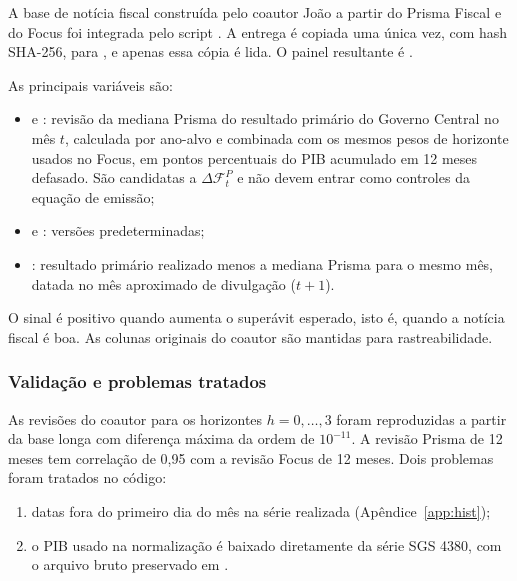 \documentclass[12pt,a4paper]{article}
\begin{document}
A base de notícia fiscal construída pelo coautor João a partir do Prisma Fiscal e do
Focus foi integrada pelo script . A entrega é
copiada uma única vez, com hash SHA-256, para
, e apenas essa cópia é lida. O painel
resultante é .

As principais variáveis são:

\begin{itemize}[leftmargin=1.2cm]
    \item {} e
    : revisão da mediana Prisma do resultado
    primário do Governo Central no mês \(t\), calculada por ano-alvo e combinada com
    os mesmos pesos de horizonte usados no Focus, em pontos percentuais do PIB
    acumulado em 12 meses defasado. São candidatas a \(\Delta\mathcal{F}_t^P\) e não
    devem entrar como controles da equação de emissão;
    \item {} e
    : versões predeterminadas;
    \item {}: resultado primário realizado menos
    a mediana Prisma para o mesmo mês, datada no mês aproximado de divulgação
    (\(t+1\)).
\end{itemize}

O sinal é positivo quando aumenta o superávit esperado, isto é, quando a notícia
fiscal é boa. As colunas originais do coautor são mantidas para rastreabilidade.

\subsubsection{Validação e problemas tratados}

As revisões do coautor para os horizontes \(h=0,\dots,3\) foram reproduzidas a partir
da base longa com diferença máxima da ordem de \(10^{-11}\). A revisão Prisma de 12
meses tem correlação de 0,95 com a revisão Focus de 12 meses. Dois problemas foram
tratados no código:

\begin{enumerate}[leftmargin=1.2cm]
    \item datas fora do primeiro dia do mês na série realizada (Apêndice~\ref{app:hist});
    \item o PIB usado na normalização é baixado diretamente da série SGS 4380, com o
    arquivo bruto preservado em .
\end{enumerate}
\end{document}
